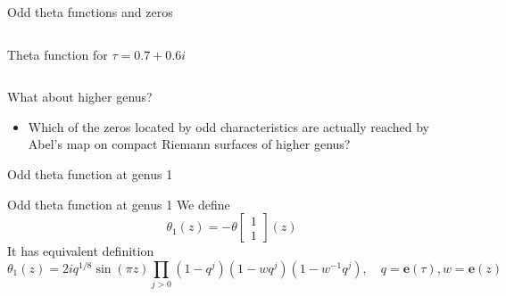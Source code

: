 \documentclass[11pt,aspectratio=169]{beamer}
\newcommand{\ee}[0]{\mathbf{e}}
\begin{document}
\begin{frame}{Odd theta functions and zeros}
\begin{columns}[onlytextwidth]
\begin{column}{0.45\textwidth}
            \tiny Theta function for $\tau = 0.7+0.6i$
            
            \cite{Cha22}
        \end{column}
    \end{columns}

    \pause{}

    {
        \begin{block}{What about higher genus?}
            \begin{itemize}
                \item Which of the zeros located by odd characteristics are actually reached by Abel's map on compact Riemann surfaces of higher genus?
            \end{itemize}
        \end{block}
    }
\end{frame}

\begin{frame}{Odd theta function at genus 1}
    \begin{block}{Odd theta function at genus 1}
        We define
        \[\theta_1(z) = -\theta \begin{bmatrix} 1 \\ 1 \end{bmatrix}(z)\]
        It has equivalent definition
        \[\theta_1(z) = 2iq^{1/8} \sin(\pi z) \prod_{j>0} (1-q^j) (1-wq^j)(1-w^{-1}q^j) , \quad q=\ee(\tau),w=\ee(z)\]
    \end{block}
\end{frame}
\end{document}
